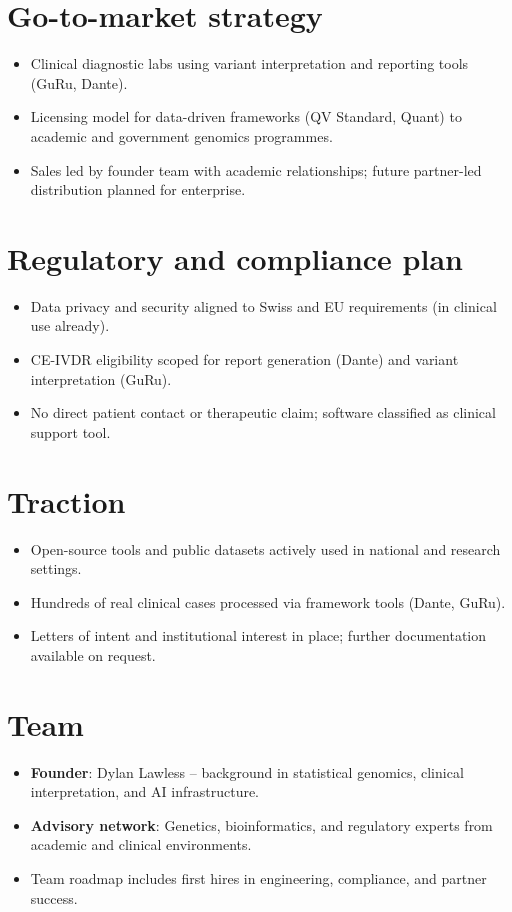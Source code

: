 \section*{Go-to-market strategy}
\begin{itemize}[leftmargin=*]
  \item Clinical diagnostic labs using variant interpretation and reporting tools (GuRu, Dante).
  \item Licensing model for data-driven frameworks (QV Standard, Quant) to academic and government genomics programmes.
  \item Sales led by founder team with academic relationships; future partner-led distribution planned for enterprise.
\end{itemize}

\section*{Regulatory and compliance plan}
\begin{itemize}[leftmargin=*]
  \item Data privacy and security aligned to Swiss and EU requirements (in clinical use already).
  \item CE-IVDR eligibility scoped for report generation (Dante) and variant interpretation (GuRu).
  \item No direct patient contact or therapeutic claim; software classified as clinical support tool.
\end{itemize}

\section*{Traction}
\begin{itemize}[leftmargin=*]
  \item Open-source tools and public datasets actively used in national and research settings.
  \item Hundreds of real clinical cases processed via framework tools (Dante, GuRu).
  \item Letters of intent and institutional interest in place; further documentation available on request.
\end{itemize}

\section*{Team}
\begin{itemize}[leftmargin=*]
  \item \textbf{Founder}: Dylan Lawless – background in statistical genomics, clinical interpretation, and AI infrastructure.
  \item \textbf{Advisory network}: Genetics, bioinformatics, and regulatory experts from academic and clinical environments.
  \item Team roadmap includes first hires in engineering, compliance, and partner success.
\end{itemize}

